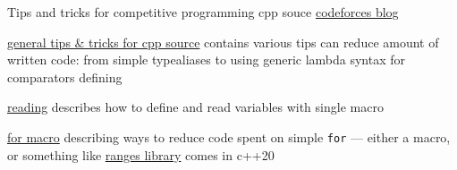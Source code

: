 


\begin{cventries}


\cventry
{}
{Tips and tricks for competitive programming cpp souce} %
{\href{https://codeforces.com/blog/dendi239}{codeforces blog}} %
{}
{
\begin{cvitems}
\item {
\href{https://codeforces.com/blog/entry/79446}{general tips \& tricks for cpp source} contains various tips can reduce amount of written code: from simple typealiases to using generic lambda syntax for comparators defining
}
\item {
\href{https://codeforces.com/blog/entry/79066}{reading} describes how to define and read variables with single macro
}
\item {
\href{https://codeforces.com/blog/entry/79100}{for macro} describing ways to reduce code spent on simple \texttt{for} ---
either a macro, or something like \href{https://en.cppreference.com/w/cpp/ranges}{ranges library} comes in c++20
}
\end{cvitems}
}


\end{cventries}